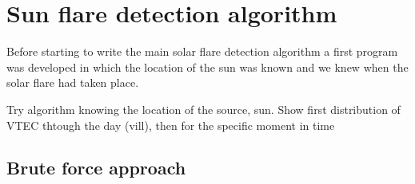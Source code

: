 \chapter{Sun flare detection algorithm}

Before starting to write the main solar flare detection algorithm a first program was developed in which the location of the sun was known and we knew when the solar flare had taken place.

Try algorithm knowing the location of the source, sun. Show first distribution of VTEC thtough the day (vill), then for the specific moment in time


\section{Brute force approach}
